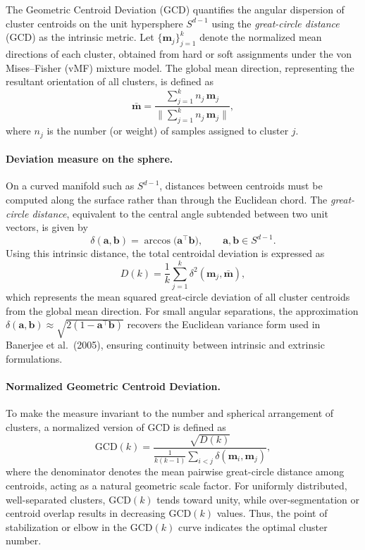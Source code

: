 \documentclass[12pt,a4paper]{report}
\begin{document}
The Geometric Centroid Deviation (GCD) quantifies the angular dispersion of cluster centroids on the unit hypersphere $S^{d-1}$ using the \textit{great-circle distance} (GCD) as the intrinsic metric.  
Let $\{\mathbf{m}_j\}_{j=1}^{k}$ denote the normalized mean directions of each cluster, obtained from hard or soft assignments under the von Mises–Fisher (vMF) mixture model.  
The global mean direction, representing the resultant orientation of all clusters, is defined as
\begin{equation}
\bar{\mathbf{m}} = \frac{\sum_{j=1}^{k} n_j\,\mathbf{m}_j}{\Big\|\sum_{j=1}^{k} n_j\,\mathbf{m}_j\Big\|},
\label{eq:global_mean_dir}
\end{equation}
where $n_j$ is the number (or weight) of samples assigned to cluster $j$.

\paragraph{Deviation measure on the sphere.}
On a curved manifold such as $S^{d-1}$, distances between centroids must be computed along the surface rather than through the Euclidean chord.  
The \textit{great-circle distance}, equivalent to the central angle subtended between two unit vectors, is given by
\begin{equation}
\delta(\mathbf{a},\mathbf{b}) = \arccos\!\big(\mathbf{a}^{\top}\mathbf{b}\big), 
\qquad \mathbf{a},\mathbf{b}\in S^{d-1}.
\label{eq:gcd_angle}
\end{equation}
Using this intrinsic distance, the total centroidal deviation is expressed as
\begin{equation}
D(k) = \frac{1}{k}\sum_{j=1}^{k} \delta^{2}(\mathbf{m}_j,\bar{\mathbf{m}}),
\label{eq:gcd_sum}
\end{equation}
which represents the mean squared great-circle deviation of all cluster centroids from the global mean direction.  
For small angular separations, the approximation $\delta(\mathbf{a},\mathbf{b}) \approx \sqrt{2(1-\mathbf{a}^{\top}\mathbf{b})}$ recovers the Euclidean variance form used in Banerjee et al.~(2005), ensuring continuity between intrinsic and extrinsic formulations.

\paragraph{Normalized Geometric Centroid Deviation.}
To make the measure invariant to the number and spherical arrangement of clusters, a normalized version of GCD is defined as
\begin{equation}
\mathrm{GCD}(k) = 
\frac{\sqrt{D(k)}}{\frac{1}{k(k-1)}\sum_{i<j}\delta(\mathbf{m}_i,\mathbf{m}_j)},
\label{eq:gcd_norm}
\end{equation}
where the denominator denotes the mean pairwise great-circle distance among centroids, acting as a natural geometric scale factor.  
For uniformly distributed, well-separated clusters, $\mathrm{GCD}(k)$ tends toward unity, while over-segmentation or centroid overlap results in decreasing $\mathrm{GCD}(k)$ values.  
Thus, the point of stabilization or elbow in the $\mathrm{GCD}(k)$ curve indicates the optimal cluster number.
\end{document}
